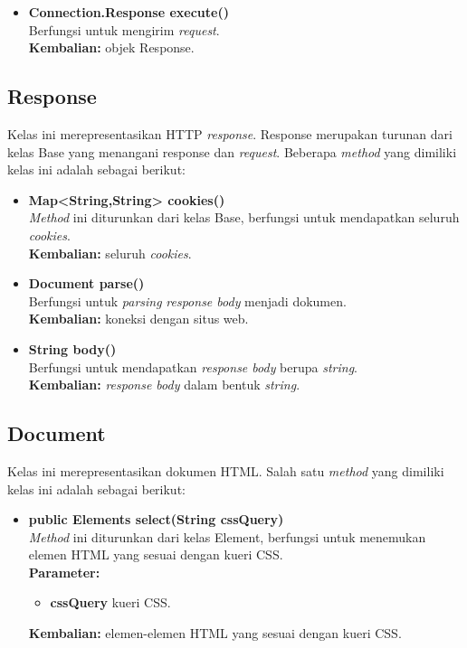 \begin{itemize}
		\item \textbf{Connection.Response execute()} \\
		Berfungsi untuk mengirim \textit{request}.\\
		\textbf{Kembalian:} objek Response.	
\end{itemize}

\subsection{Response}

Kelas ini merepresentasikan HTTP \textit{response}. Response merupakan turunan dari kelas Base yang menangani response dan \textit{request}. Beberapa \textit{method} yang dimiliki kelas ini adalah sebagai berikut:
\begin{itemize}
	\item \textbf{Map<String,String> cookies()} \\
		\textit{Method} ini diturunkan dari kelas Base, berfungsi untuk mendapatkan seluruh \textit{cookies}. \\
		\textbf{Kembalian:} seluruh \textit{cookies}.	
		
		\item \textbf{Document parse()} \\
		Berfungsi untuk \textit{parsing} \textit{response body} menjadi dokumen. \\
		\textbf{Kembalian:} koneksi dengan situs web.
		
		\item \textbf{String body()} \\
		Berfungsi untuk mendapatkan \textit{response body} berupa \textit{string}. \\
		\textbf{Kembalian:} \textit{response body} dalam bentuk \textit{string}.
\end{itemize}

\subsection{Document}

Kelas ini merepresentasikan dokumen HTML. Salah satu \textit{method} yang dimiliki kelas ini adalah sebagai berikut:
\begin{itemize}
	\item \textbf{public Elements select(String cssQuery)} \\
		\textit{Method} ini diturunkan dari kelas Element, berfungsi untuk menemukan elemen HTML yang sesuai dengan kueri CSS. \\
		\textbf{Parameter:} 
		\begin{itemize}
			\item \textbf{cssQuery} kueri CSS.
		\end{itemize}
		\textbf{Kembalian:} elemen-elemen HTML yang sesuai dengan kueri CSS.	
\end{itemize}

